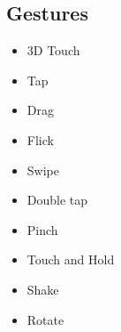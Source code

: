 \subsection {Gestures}

	\begin{itemize}
  		\vspace{-0.4cm}\item 3D Touch
		\vspace{-0.4cm}\item Tap
		\vspace{-0.4cm}\item Drag
		\vspace{-0.4cm}\item Flick
		\vspace{-0.4cm}\item Swipe
		\vspace{-0.4cm}\item Double tap
		\vspace{-0.4cm}\item Pinch
		\vspace{-0.4cm}\item Touch and Hold
		\vspace{-0.4cm}\item Shake
		\vspace{-0.4cm}\item Rotate
	\end{itemize}

